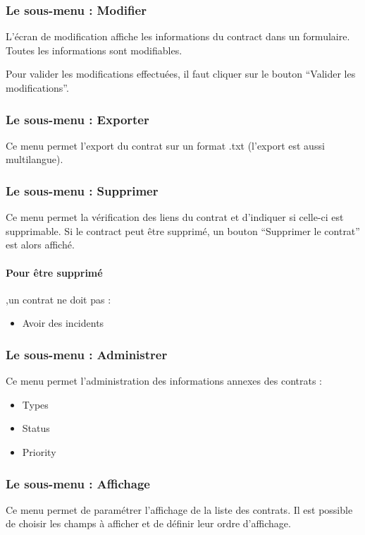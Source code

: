 \subsubsection{Le sous-menu : Modifier}

L'écran de modification affiche les informations du contract dans un formulaire.
Toutes les informations sont modifiables.

Pour valider les modifications effectuées, il faut cliquer sur le bouton ``Valider les modifications''.

\subsubsection{Le sous-menu : Exporter}

Ce menu permet l'export du contrat sur un format .txt (l'export est aussi multilangue).


\subsubsection{Le sous-menu : Supprimer}

Ce menu permet la vérification des liens du contrat et d'indiquer si celle-ci est supprimable.
Si le contract peut être supprimé, un bouton ``Supprimer le contrat'' est alors affiché.

\paragraph{Pour être supprimé},un contrat ne doit pas :\\

\begin{itemize}
\item Avoir des incidents
\end{itemize}


\subsubsection{Le sous-menu : Administrer}

Ce menu permet l'administration des informations annexes des contrats :\\

\begin{itemize}
\item Types
\item Status
\item Priority
\end{itemize}

\subsubsection{Le sous-menu : Affichage}

Ce menu permet de paramétrer l'affichage de la liste des contrats. Il est possible de choisir les champs à afficher et de définir leur ordre d'affichage.
